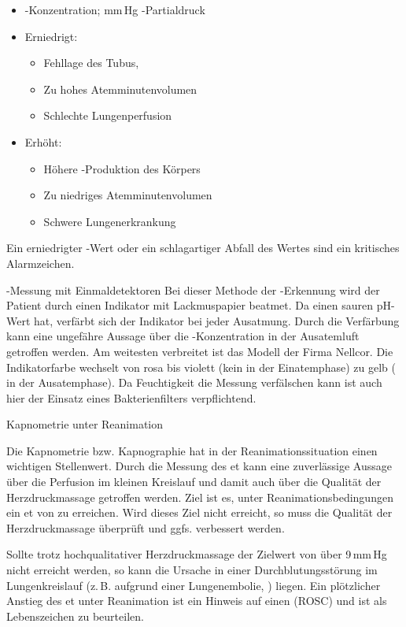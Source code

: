 {%
\begin{itemize}
  \item[\SymbolFindingNormal]
  \PC* {}-Konzentration;
   mm\,Hg -Partialdruck
  \item Erniedrigt: 
  \begin{itemize}
    \item {Fehllage} des Tubus, 
    \item {Zu hohes Atemminutenvolumen} 
    \item {Schlechte Lungenperfusion} 
  \end{itemize}
  \item Erhöht: 
  \begin{itemize}
    \item {Höhere -Produktion} des Körpers 
    \item {Zu niedriges Atemminutenvolumen}
    \item Schwere Lungenerkrankung
  \end{itemize}
\end{itemize}
}


\begin{Danger}
  \item Ein erniedrigter -Wert oder ein schlagartiger Abfall des Wertes sind ein kritisches Alarmzeichen.
\end{Danger}

\Text
{-Messung mit Einmaldetektoren}%
{%
Bei dieser Methode der -Erkennung wird der Patient durch einen Indikator mit Lackmuspapier beatmet. 
%
Da  einen sauren pH-Wert hat, 
verfärbt sich der Indikator bei jeder Ausatmung. 
%
Durch die Verfärbung kann eine ungefähre Aussage über die -Konzentration in der Ausatemluft getroffen werden.
%
Am weitesten verbreitet ist das Modell  der Firma Nellcor. 
%
Die Indikatorfarbe wechselt von rosa bis violett 
(kein  in der Einatemphase) 
zu gelb ( in der Ausatemphase). 
%
Da Feuchtigkeit die Messung verfälschen kann ist auch hier der Einsatz eines Bakterienfilters verpflichtend.
}%

\Text
{Kapnometrie unter Reanimation}%
{%
Die Kapnometrie bzw. Kapnographie hat in der Reanimationssituation einen wichtigen Stellenwert. 
%
Durch die Messung des et kann eine zuverlässige Aussage 
über die Perfusion im kleinen Kreislauf 
und damit auch über die Qualität der Herzdruckmassage getroffen werden.
%
Ziel ist es, unter Reanimationsbedingungen ein 
et von  zu erreichen. 
%
Wird dieses Ziel nicht erreicht, 
so muss die Qualität der Herzdruckmassage überprüft 
und ggfs. verbessert werden. 
%

Sollte trotz hochqualitativer Herzdruckmassage der Zielwert von über 9\,mm\,Hg nicht erreicht werden, 
so kann die Ursache in einer Durchblutungsstörung im Lungenkreislauf 
(z.\,B. aufgrund einer Lungenembolie, ) liegen. 
%
Ein plötzlicher Anstieg des et unter Reanimation ist ein Hinweis auf einen  (ROSC) 
und ist als Lebenszeichen zu beurteilen.
}%

